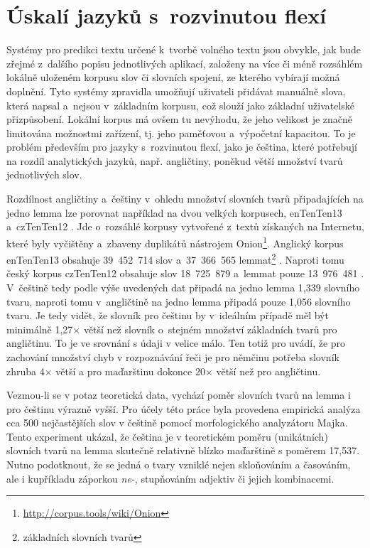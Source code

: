 \documentclass[a4paper,11pt,openany]{book} %
\begin{document}
\section{Úskalí jazyků s~rozvinutou flexí}

Systémy pro predikci textu určené k~tvorbě volného textu jsou obvykle, jak bude zřejmé z~dalšího popisu jednotlivých aplikací, založeny na více či méně rozsáhlém lokálně uloženém korpusu slov či slovních spojení, ze kterého vybírají možná doplnění. Tyto systémy zpravidla umožňují uživateli přidávat manuálně slova, která napsal a~nejsou v~základním korpusu, což slouží jako základní uživatelské přizpůsobení. Lokální korpus má ovšem tu nevýhodu, že jeho velikost je značně limitována možnostmi zařízení, tj. jeho paměťovou a~výpočetní kapacitou. To je problém především pro jazyky s~rozvinutou flexí, jako je čeština, které potřebují na rozdíl analytických jazyků, např. angličtiny, poněkud větší množství tvarů jednotlivých slov. 

Rozdílnost angličtiny a~češtiny v~ohledu množství slovních tvarů připadajících na jedno lemma lze porovnat například na dvou velkých korpusech, enTenTen13 a~czTenTen12 \parencite{suchomel2012}. Jde o~rozsáhlé korpusy vytvořené z~textů získaných na Internetu, které byly vyčištěny a~zbaveny duplikátů nástrojem Onion\footnote{\url{http://corpus.tools/wiki/Onion}}. Anglický korpus enTenTen13 obsahuje 39~452~714 slov a~37~366~565 lemmat\footnote{základních slovních tvarů} \parencite{czTenTen12_info}. Naproti tomu český korpus czTenTen12 obsahuje slov 18~725~879 a~lemmat pouze 13~976~481 \parencite{enTenTen13_info}. V~češtině tedy podle výše uvedených dat připadá na jedno lemma 1,339 slovního tvaru, naproti tomu v~angličtině na jedno lemma připadá pouze 1,056 slovního tvaru. Je tedy vidět, že slovník pro češtinu by v~ideálním případě měl být minimálně 1,27× větší než slovník o~stejném množství základních tvarů pro angličtinu. To je ve srovnání s údaji v \parencite{nemeth2012word} velice málo. Ten totiž pro uvádí, že pro zachování množství chyb v rozpoznávání řeči je pro němčinu potřeba slovník zhruba 4× větší a pro maďarštinu dokonce 20× větší než pro angličtinu.

Vezmou-li se v potaz teoretická data, vychází poměr slovních tvarů na lemma i pro češtinu výrazně vyšší. Pro účely této práce byla provedena empirická analýza cca 500 nejčastějších slov v češtině pomocí morfologického analyzátoru Majka. Tento experiment ukázal, že čeština je v teoretickém poměru (unikátních) slovních tvarů na lemma skutečně relativně blízko maďarštině s poměrem 17,537. Nutno podotknout, že se jedná o tvary vzniklé nejen skloňováním a časováním, ale i kupříkladu záporkou {\it ne-}, stupňováním adjektiv či jejich kombinacemi.
\end{document}
